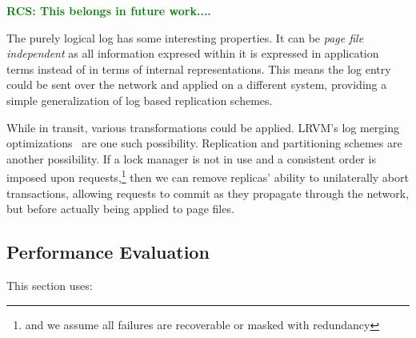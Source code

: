 \documentclass[letterpaper,twocolumn,english]{article}
\newcommand{\yad}{Lemon\xspace}
\newcommand{\rcs}[1]{\textcolor{green}{\bf RCS: #1}}
\begin{document}
\rcs{ This belongs in future work....}

The purely logical log has some interesting properties.  It can be
{\em page file independent} as all information expresed within it is
expressed in application terms instead of in terms of internal
representations.  This means the log entry could be sent over the
network and applied on a different system, providing a simple
generalization of log based replication schemes.

While in transit, various transformations could be applied.  LRVM's
log merging optimizations~\cite{LRVM} are one such possibility.
Replication and partitioning schemes are another possibility.  If a
lock manager is not in use and a consistent order is imposed upon
requests,\footnote{and we assume all failures are recoverable or
masked with redundancy} then we can remove replicas' ability to
unilaterally abort transactions, allowing requests to commit as they
propagate through the network, but before actually being applied to
page files.


\subsection {Performance Evaluation}


This section uses:
\end{document}
